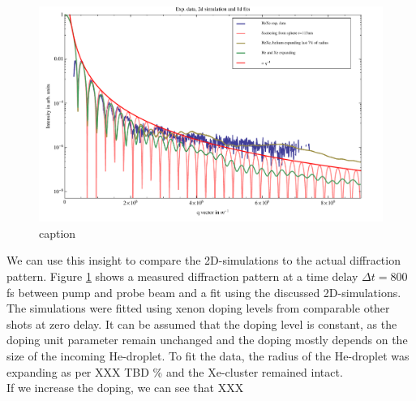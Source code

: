 \begin{figure}
	\centering
		\includegraphics[width=1.00\textwidth]{images/results/HeXe-cluster-113-0-5-doping.pdf}
	\caption{caption}
	\label{fig:HeXe-cluster-113-0.5}
\end{figure}
We can use this insight to compare the 2D-simulations to the actual diffraction pattern. Figure \ref{fig:HeXe-cluster-113-0.5} shows a measured diffraction pattern at a time delay $\Delta t=800$ fs between pump and probe beam and a fit using the discussed 2D-simulations. The simulations were fitted using xenon doping levels from comparable other shots at zero delay. It can be assumed that the doping level is constant, as the doping unit parameter remain unchanged and the doping mostly depends on the size of the incoming He-droplet. To fit the data, the radius of the He-droplet was expanding as per XXX TBD \% and the Xe-cluster remained intact.\\
If we increase the doping, we can see that XXX
%
%
%

